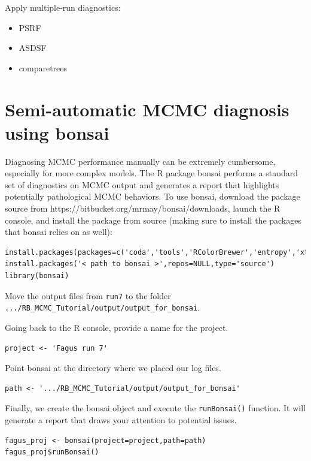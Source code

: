 \documentclass[11pt]{article}
\begin{document}
Apply multiple-run diagnostics:
\begin{itemize}
\item{PSRF}
\item{ASDSF}
\item{comparetrees}
\end{itemize}

	
	

\bigskip
\section{Semi-automatic MCMC diagnosis using bonsai}

Diagnosing MCMC performance manually can be extremely cumbersome, especially for more complex models.
The R package bonsai performs a standard set of diagnostics on MCMC output and generates a report that highlights potentially pathological MCMC behaviors.
To use bonsai, download the package source from https://bitbucket.org/mrmay/bonsai/downloads, launch the R console, and install the package from source (making sure to install the packages that bonsai relies on as well):
{\tt \begin{snugshade*}
\begin{lstlisting}
install.packages(packages=c('coda','tools','RColorBrewer','entropy','xtable'),dependencies=TRUE)
install.packages('< path to bonsai >',repos=NULL,type='source')
library(bonsai)
\end{lstlisting}
\end{snugshade*}}

Move the output files from \texttt{run7} to the folder \verb!.../RB_MCMC_Tutorial/output/output_for_bonsai!.

Going back to the R console, provide a name for the project.
{\tt \begin{snugshade*}
\begin{lstlisting}
project <- 'Fagus run 7'
\end{lstlisting}
\end{snugshade*}}

Point bonsai at the directory where we placed our log files.
{\tt \begin{snugshade*}
\begin{lstlisting}
path <- '.../RB_MCMC_Tutorial/output/output_for_bonsai'
\end{lstlisting}
\end{snugshade*}}

Finally, we create the bonsai object and execute the \texttt{runBonsai()} function.
It will generate a report that draws your attention to potential issues.
{\tt \begin{snugshade*}
\begin{lstlisting}
fagus_proj <- bonsai(project=project,path=path)
fagus_proj$runBonsai()
\end{lstlisting}
\end{snugshade*}}
\end{document}
